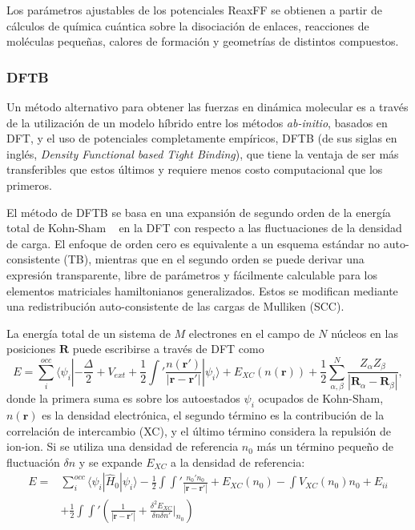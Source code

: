 Los parámetros ajustables de los potenciales ReaxFF se obtienen a partir de 
cálculos de química cuántica sobre la disociación de enlaces, reacciones de 
moléculas pequeñas, calores de formación y geometrías de distintos compuestos.

\subsubsection{DFTB}

Un método alternativo para obtener las fuerzas en dinámica molecular es a través
de la utilización de un modelo híbrido entre los métodos \textit{ab-initio},
basados en DFT, y el uso de potenciales completamente empíricos, DFTB (de sus 
siglas en inglés, \textit{Density Functional based Tight Binding}), que tiene
la ventaja de ser más transferibles que estos últimos y requiere menos costo
computacional que los primeros.

El método de DFTB se basa en una expansión de segundo orden de la energía total 
de Kohn-Sham ~\cite{dft1, dft2} en la DFT con respecto a las fluctuaciones de la 
densidad de carga. El enfoque de orden cero es equivalente a un esquema estándar 
no auto-consistente (TB), mientras que en el segundo orden se puede derivar una 
expresión transparente, libre de parámetros y fácilmente calculable para los 
elementos matriciales hamiltonianos generalizados. Estos se modifican mediante 
una redistribución auto-consistente de las cargas de Mulliken (SCC).

La energía total de un sistema de $M$ electrones en el campo de $N$ núcleos en
las posiciones $\mathbf{R}$ puede escribirse a través de DFT como
$$
E = \sum_i^{occ} \langle \psi_i | - \frac{\Delta}{2} + V_{ext} + \frac{1}{2} \int' \frac{n(\mathbf{r}')}{|\mathbf{r} - \mathbf{r}'|} | \psi_i \rangle + E_{XC}(n(\mathbf{r})) + \frac{1}{2} \sum_{\alpha, \beta}^N \frac{Z_{\alpha}Z_{\beta}}{|\mathbf{R}_{\alpha} - \mathbf{R}_{\beta}|},
$$
donde la primera suma es sobre los autoestados $\psi_i$ ocupados de Kohn-Sham,
$n(\mathbf{r})$ es la densidad electrónica, el segundo término es la contribución
de la correlación de intercambio (XC), y el último término considera la repulsión
de ion-ion. Si se utiliza una densidad de referencia $n_0$ más un término 
pequeño de fluctuación $\delta n$ y se expande $E_{XC}$ a la densidad de 
referencia:
\begin{equation}\label{eq:dft-fluc}
    \begin{aligned}
        E =& \sum_i^{occ} \langle \psi_i | \hat{H}_0 | \psi_i \rangle - \frac{1}{2} \int \int' \frac{n_0' n_0}{|\mathbf{r} - \mathbf{r}'|} + E_{XC}(n_0) - \int V_{XC}(n_0)n_0 + E_{ii} \\
        &+ \frac{1}{2} \int \int' \left(\frac{1}{|\mathbf{r} - \mathbf{r}'|} + \frac{\delta^2 E_{XC}}{\delta n \delta n'}\bigg\rvert_{n_0} \right)
    \end{aligned}
\end{equation}

